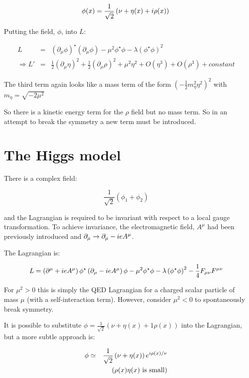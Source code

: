 \[
  \phi(x) = \frac{1}{\sqrt{2}}\left(\nu + \eta(x) + i\rho(x)\right) \\
\]

Putting the field, $\phi$, into $L$:

\begin{eqnarray*}
  L & = & \left(\partial_{\mu}\phi\right)^{\star}\left(\partial_{\mu}\phi\right) - \mu^2\phi^{\star}\phi - \lambda\left(\phi^{\star}\phi\right)^2 \\
  \Rightarrow L' & = & \frac{1}{2}\left(\partial_{\mu}\eta\right)^2 + \frac{1}{2}\left(\partial_{\mu}\rho\right)^2 + \mu^2\eta^2 + O(\eta^3) + O(\rho^3) + constant
\end{eqnarray*}

The third term again looks like a mass term of the form $\left(-\frac{1}{2}m_{\eta}^2\eta^2\right)^2$ with $m_{\eta} = \sqrt{-2\mu^2}$

So there is a kinetic energy term for the $\rho$ field but no mass term.  So in an attempt to break the symmetry a new term must be introduced.

\section{The Higgs model}

There is a complex field:

\[
  \frac{1}{\sqrt{2}}\left(\phi_1 + \phi_2\right)
\]

and the Lagrangian is required to be invariant with respect to a local gauge transformation.  To achieve invariance, the electromagnetic field, $A^{\mu}$ had been previously introduced and $\partial_{\mu} \to \partial_{\mu} - ie A^{\mu}$.

The Lagrangian is:

\[
  L = \left(\partial^{\mu} + ie A^{\mu}\right)\phi^{\star}\left(\partial_{\mu} - ie A^{\mu}\right)\phi - \mu^2 \phi^{\star}\phi - \lambda\left(\phi^{\star}\phi\right)^2 - \frac{1}{4}F_{\mu\nu}F^{\mu\nu}
\]

For $\mu^2>0$ this is simply the QED Lagrangian for a charged scalar particle of mass $\mu$ (with a self-interaction term).  However, consider $\mu^2<0$ to spontaneously break symmetry.

It is possible to substitute $\phi = \frac{1}{\sqrt{2}}\left(\nu + \eta(x) + 1\rho(x)\right)$ into the Lagrangian, but a more subtle approach is:

\begin{eqnarray*}
  \phi & \simeq & \frac{1}{\sqrt{2}}\left(\nu + \eta(x)\right) e^{i\rho(x)/\nu} \\
  & & \left( \rho(x)\eta(x) \textrm{ is small}\right)
\end{eqnarray*}

